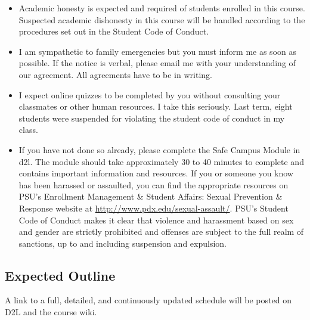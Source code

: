 \documentclass[letterpaper,10pt]{article}
\begin{document}
\begin{itemize}
\item Academic honesty is expected and required of students enrolled
  in this course.  Suspected academic dishonesty in this course will
  be handled according to the procedures set out in the Student Code
  of Conduct.

\item I am sympathetic to family emergencies but you must inform me as
  soon as possible. If the notice is verbal, please email me with your
  understanding of our agreement. All agreements have to be in
  writing.

\item I expect online quizzes to be completed by you without consulting your classmates or other human resources.  I take this seriously.  Last term, eight students were suspended for violating the student code of conduct in my class.

\item If you have not done so already, please complete the Safe Campus Module in d2l. The module should take approximately 30 to 40 minutes to complete and contains important information and resources. If you or someone you know has been harassed or assaulted, you can find the appropriate resources on PSU’s Enrollment Management & Student Affairs: Sexual Prevention & Response website at \url{http://www.pdx.edu/sexual-assault/}. PSU's Student Code of Conduct makes it clear that violence and harassment based on sex and gender are strictly prohibited and offenses are subject to the full realm of sanctions, up to and including suspension and expulsion. 

\end{itemize}


\subsection{Expected Outline}
A link to a full, detailed, and continuously updated schedule will be
posted on D2L and the course wiki.
\end{document}
